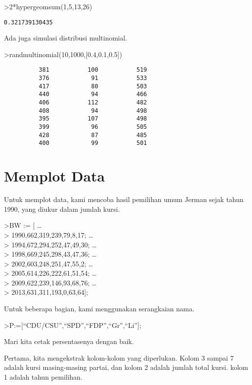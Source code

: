 \documentclass[
]{book}
\begin{document}
\textgreater2*hypergeomsum(1,5,13,26)

\begin{verbatim}
0.321739130435
\end{verbatim}

Ada juga simulasi distribusi multinomial.

\textgreater randmultinomial(10,1000,{[}0.4,0.1,0.5{]})

\begin{verbatim}
          381           100           519 
          376            91           533 
          417            80           503 
          440            94           466 
          406           112           482 
          408            94           498 
          395           107           498 
          399            96           505 
          428            87           485 
          400            99           501 
\end{verbatim}

\chapter{Memplot Data}\label{memplot-data}

Untuk memplot data, kami mencoba hasil pemilihan umum Jerman sejak tahun 1990, yang diukur dalam jumlah kursi.

\textgreater BW := {[} \ldots{}\\
\textgreater{} 1990,662,319,239,79,8,17; \ldots{}\\
\textgreater{} 1994,672,294,252,47,49,30; \ldots{}\\
\textgreater{} 1998,669,245,298,43,47,36; \ldots{}\\
\textgreater{} 2002,603,248,251,47,55,2; \ldots{}\\
\textgreater{} 2005,614,226,222,61,51,54; \ldots{}\\
\textgreater{} 2009,622,239,146,93,68,76; \ldots{}\\
\textgreater{} 2013,631,311,193,0,63,64{]};

Untuk beberapa bagian, kami menggunakan serangkaian nama.

\textgreater P:={[}``CDU/CSU'',``SPD'',``FDP'',``Gr'',``Li''{]};

Mari kita cetak persentasenya dengan baik.

Pertama, kita mengekstrak kolom-kolom yang diperlukan. Kolom 3 sampai 7 adalah kursi masing-masing partai, dan kolom 2 adalah jumlah total kursi. kolom 1 adalah tahun pemilihan.
\end{document}
